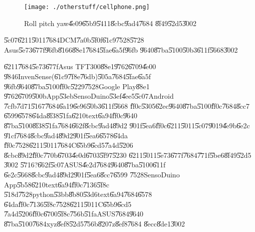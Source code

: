 \clearpage%

\begin{figure}[th]
\caption{Roll pitch yaw\U{4e09}\U{65b9}\U{5411}\U{8cbc}\U{9ad4}\U{7684}%
\U{8f49}\U{52d5}\U{3002}}
\begin{center}
\texttt{[image: ./otherstuff/cellphone.png]}
\end{center}
\end{figure}

\begin{case}
\U{5c07}\U{6211}\U{5011}\U{7684}DCM\U{7a0b}\U{5f0f}\U{61c9}\U{7528}\U{5728}%
Asus\U{5e73}\U{677f}\U{96fb}\U{8166}\U{88e1}\U{7684}\U{5fae}\U{6a5f}\U{96fb}%
\U{9640}\U{87ba}\U{5100}\U{50b3}\U{611f}\U{5668}\U{3002}
\end{case}

\U{6211}\U{7684}\U{5e73}\U{677f}Asus TFT300\U{88e1}\U{9762}\U{6709}\U{4e00}%
\U{9846}InvenSense(\U{61c9}\U{7f8e}\U{76db})\U{505a}\U{7684}\U{5fae}\U{6a5f}%
\U{96fb}\U{9640}\U{87ba}\U{5100}\U{ff0c}\U{5229}\U{7528}Google Play\U{88e1}%
\U{9762}\U{6709}\U{500b}App\U{53eb}SensoDuino\U{53ef}\U{4ee5}\U{5c07}Android%
\U{7cfb}\U{7d71}\U{5167}\U{7684}\U{6a19}\U{6e96}\U{50b3}\U{611f}\U{5668}%
\U{ff0c}\U{5305}\U{62ec}\U{9640}\U{87ba}\U{5100}\U{ff0c}\U{7684}\U{8cc7}%
\U{6599}\U{6578}\U{64da}\U{8f38}\U{51fa}\U{6210}text\U{6a94}\U{ff0c}\U{9640}%
\U{87ba}\U{5100}\U{8f38}\U{51fa}\U{7684}\U{662f}\U{8cbc}\U{9ad4}\U{89d2}%
\U{901f}\U{5ea6}\U{ff0c}\U{6211}\U{5011}\U{5c07}\U{9019}\U{4e9b}\U{6e2c}%
\U{91cf}\U{7684}\U{8cbc}\U{9ad4}\U{89d2}\U{901f}\U{5ea6}\U{6578}\U{64da}%
\U{ff0c}\U{7528}\U{6211}\U{5011}\U{7684}C\U{65b9}\U{6cd5}\U{7a4d}\U{5206}%
\U{8cbc}\U{89d2}\U{ff0c}\U{770b}\U{6703}\U{4e0d}\U{6703}\U{5f97}\U{5230}%
\U{6211}\U{5011}\U{5e73}\U{677f}\U{7684}\U{771f}\U{5be6}\U{8f49}\U{52d5}%
\U{3002}\newline
\U{5716}?\U{662f}\U{5c07}ASUS\U{4e2d}\U{7684}\U{9640}\U{87ba}\U{5100}\U{611f}%
\U{6e2c}\U{5668}\U{8cbc}\U{9ad4}\U{89d2}\U{901f}\U{5ea6}\U{8cc7}\U{6599}%
\U{7528}SensoDuino App\U{5b58}\U{6210}text\U{6a94}\U{ff0c}\U{7136}\U{5f8c}%
\U{518d}\U{7528}python\U{53bb}\U{8b80}\U{53d6}text\U{6a94}\U{7684}\U{6578}%
\U{64da}\U{ff0c}\U{7136}\U{5f8c}\U{7528}\U{6211}\U{5011}C\U{65b9}\U{6cd5}%
\U{7a4d}\U{5206}\U{ff0c}\U{6700}\U{5f8c}\U{756b}\U{51fa}ASUS\U{7684}\U{9640}%
\U{87ba}\U{5100}\U{7684}xyz\U{8ef8}\U{52d5}\U{756b}\U{8207}z\U{8ef8}\U{7684}%
\U{8ecc}\U{8de1}\U{3002}

